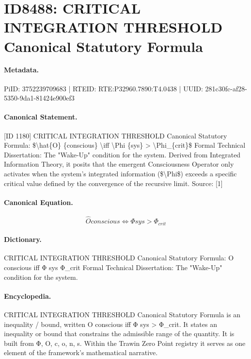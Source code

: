 \section*{ID8488: CRITICAL INTEGRATION THRESHOLD Canonical Statutory Formula}
\paragraph{Metadata.}
PiID: 3752239709683 | RTEID: RTE:P32960.7890:T4.0438 | UUID: 281c30fc-af28-5350-9da1-81424e900ef3

\paragraph{Canonical Statement.}
[ID 1180] CRITICAL INTEGRATION THRESHOLD Canonical Statutory Formula: \$\textbackslash{}hat\{O\} \{conscious\} \textbackslash{}iff \textbackslash{}Phi \{sys\} > \textbackslash{}Phi\_\{crit\}\$ Formal Technical Dissertation: The "Wake-Up" condition for the system. Derived from Integrated Information Theory, it posits that the emergent Consciousness Operator only activates when the system's integrated information (\$\textbackslash{}Phi\$) exceeds a specific critical value defined by the convergence of the recursive limit. Source: [1]

\paragraph{Canonical Equation.}
\[
\hat{O} {conscious} \iff \Phi {sys} > \Phi_{crit}
\]

\paragraph{Dictionary.}
CRITICAL INTEGRATION THRESHOLD Canonical Statutory Formula: O conscious iff Φ sys Φ\_crit Formal Technical Dissertation: The "Wake-Up" condition for the system.

\paragraph{Encyclopedia.}
CRITICAL INTEGRATION THRESHOLD Canonical Statutory Formula is an inequality / bound, written O conscious iff Φ sys > Φ\_crit. It states an inequality or bound that constrains the admissible range of the quantity. It is built from Φ, O, c, o, n, s. Within the Trawin Zero Point registry it serves as one element of the framework's mathematical narrative.
